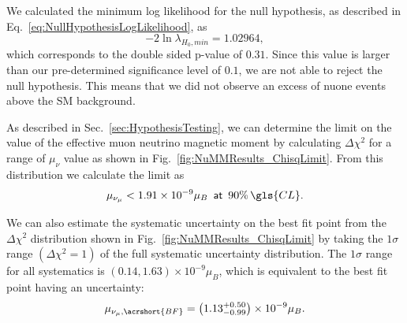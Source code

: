 
We calculated the minimum log likelihood for the null hypothesis, as described in Eq.~\ref{eq:NullHypothesisLogLikelihood}, as 
\begin{equation}
-2\ln\lambda_{H_0,min}=1.02964,
\end{equation}
which corresponds to the double sided p-value of $0.31$. Since this value is larger than our pre-determined significance level of $0.1$, we are not able to reject the null hypothesis. This means that we did not observe an excess of \gls{nuone} events above the \gls{SM} background.

As described in Sec.~\ref{sec:HypothesisTesting}, we can determine the limit on the value of the effective muon neutrino magnetic moment by calculating $\Delta\chi^2$ for a range of $\mu_\nu$ value as shown in Fig.~\ref{fig:NuMMResults_ChisqLimit}. From this distribution we calculate the limit as
\begin{equation}\label{eq:NuMMLimit}
\mu_{\nu_\mu}<1.91\times10^{-9}\mu_B\,\,\,\textsf{at}\,\,\,90\%\, \gls{CL}.
\end{equation} 

We can also estimate the systematic uncertainty on the best fit point from the $\Delta\chi^2$ distribution shown in  Fig.~\ref{fig:NuMMResults_ChisqLimit} by taking the $1\sigma$ range $\left(\Delta\chi^2=1\right)$ of the full systematic uncertainty distribution. The $1\sigma$ range for all systematics is $\left(0.14,1.63\right)\times 10^{-9}\mu_B$, which is equivalent to the best fit point having an uncertainty:
\begin{equation}
\mu_{\nu_\mu,\acrshort{BF}}=\left(1.13^{+0.50}_{-0.99}\right)\times 10^{-9}\mu_B.
\end{equation}

